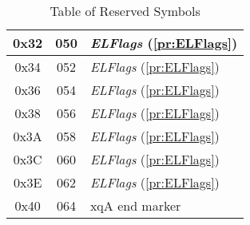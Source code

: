 \begin{table}[!hbp]
\begin{tabular}{|c|c|l|}
0x32 & 050 &   \textit{ELFlags} (\ref{pr:ELFlags})\\ \hline
0x34 & 052 &   \textit{ELFlags} (\ref{pr:ELFlags})\\ \hline
0x36 & 054 &   \textit{ELFlags} (\ref{pr:ELFlags})\\ \hline
0x38 & 056 &   \textit{ELFlags} (\ref{pr:ELFlags})\\ \hline
0x3A & 058 &   \textit{ELFlags} (\ref{pr:ELFlags})\\ \hline
0x3C & 060 &   \textit{ELFlags} (\ref{pr:ELFlags})\\ \hline
0x3E & 062 &   \textit{ELFlags} (\ref{pr:ELFlags})\\ \hline
0x40 & 064 &   xqA end marker\\ \hline
\end{tabular}
\caption{Table of Reserved Symbols}
\label{table:reservedSymbols}
\end{table}
